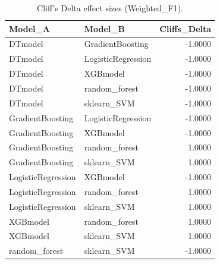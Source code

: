 \begin{table}[t]
\centering
\begin{tabular}{llr}
\toprule
Model_A & Model_B & Cliffs_Delta \\
\midrule
DTmodel & GradientBoosting & -1.0000 \\
DTmodel & LogisticRegression & -1.0000 \\
DTmodel & XGBmodel & -1.0000 \\
DTmodel & random_forest & -1.0000 \\
DTmodel & sklearn_SVM & -1.0000 \\
GradientBoosting & LogisticRegression & -1.0000 \\
GradientBoosting & XGBmodel & -1.0000 \\
GradientBoosting & random_forest & 1.0000 \\
GradientBoosting & sklearn_SVM & 1.0000 \\
LogisticRegression & XGBmodel & -1.0000 \\
LogisticRegression & random_forest & 1.0000 \\
LogisticRegression & sklearn_SVM & 1.0000 \\
XGBmodel & random_forest & 1.0000 \\
XGBmodel & sklearn_SVM & 1.0000 \\
random_forest & sklearn_SVM & -1.0000 \\
\bottomrule
\end{tabular}
\caption{Cliff's Delta effect sizes (Weighted_F1).}
\label{tab:cliffs_Weighted_F1}
\end{table}